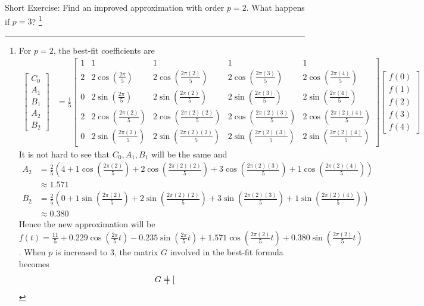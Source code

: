 Short Exercise: Find an improved approximation with order $p = 2$. What happens if $p = 3$? \footnote{For $p = 2$, the best-fit coefficients are
\begin{align*}
\begin{bmatrix}
C_0 \\
A_1 \\
B_1 \\
A_2 \\
B_2
\end{bmatrix}
&= 
\frac{1}{5}
\begin{bmatrix}
1 & 1 & 1 & 1 & 1 \\
2 & 2\cos(\frac{2\pi}{5}) & 2\cos(\frac{2\pi(2)}{5}) & 2\cos(\frac{2\pi(3)}{5}) & 2\cos(\frac{2\pi(4)}{5}) \\
0 & 2\sin(\frac{2\pi}{5}) & 2\sin(\frac{2\pi(2)}{5}) & 2\sin(\frac{2\pi(3)}{5}) & 2\sin(\frac{2\pi(4)}{5}) \\
2 & 2\cos(\frac{2\pi(2)}{5}) & 2\cos(\frac{2\pi(2)(2)}{5}) & 2\cos(\frac{2\pi(2)(3)}{5}) & 2\cos(\frac{2\pi(2)(4)}{5}) \\
0 & 2\sin(\frac{2\pi(2)}{5}) & 2\sin(\frac{2\pi(2)(2)}{5}) & 2\sin(\frac{2\pi(2)(3)}{5}) & 2\sin(\frac{2\pi(2)(4)}{5})
\end{bmatrix}
\begin{bmatrix}
f(0)\\
f(1)\\
f(2)\\
f(3)\\
f(4)
\end{bmatrix}     
\end{align*}
It is not hard to see that $C_0, A_1, B_1$ will be the same and
\begin{align*}
A_2 &= \frac{2}{5} (4 + 1\cos(\frac{2\pi(2)}{5}) + 2\cos(\frac{2\pi(2)(2)}{5}) + 3\cos(\frac{2\pi(2)(3)}{5}) + 1\cos(\frac{2\pi(2)(4)}{5})) \\
&\approx 1.571 \\
B_2 &= \frac{2}{5} (0 + 1\sin(\frac{2\pi(2)}{5}) + 2\sin(\frac{2\pi(2)(2)}{5}) + 3\sin(\frac{2\pi(2)(3)}{5}) + 1\sin(\frac{2\pi(2)(4)}{5})) \\
&\approx 0.380
\end{align*}
Hence the new approximation will be $f(t) = \frac{11}{5} + 0.229 \cos(\frac{2\pi}{5}t) - 0.235 \sin(\frac{2\pi}{5}t) + 1.571 \cos(\frac{2\pi(2)}{5}t) + 0.380 \sin(\frac{2\pi(2)}{5}t)$. When $p$ is increased to $3$, the matrix $G$ involved in the best-fit formula becomes
\begin{align*}
\scriptsize
G = 
\begin{bmatrix}

\end{bmatrix}
\end{align*}}
